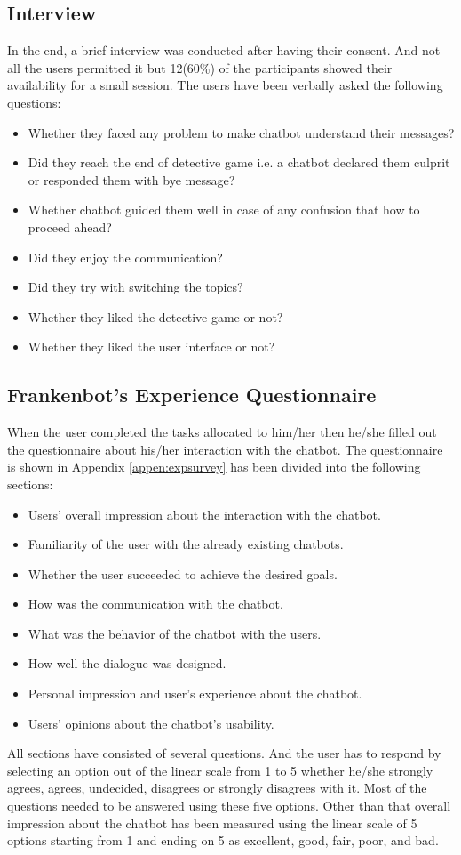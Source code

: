 \subsection{Interview\label{subsec:interview}}
In the end, a brief interview was conducted after having their consent. And not all the users permitted it but 12(60\%) of the participants showed their availability for a small session. The users have been verbally asked the following questions:
\begin{itemize}
    \item Whether they faced any problem to make chatbot understand their messages?
    \item Did they reach the end of detective game i.e. a chatbot declared them culprit or responded them with bye message?
    \item Whether chatbot guided them well in case of any confusion that how to proceed ahead?
    \item Did they enjoy the communication?
    \item Did they try with switching the topics?
    \item Whether they liked the detective game or not?
    \item Whether they liked the user interface or not?
\end{itemize}

\subsection{Frankenbot's Experience Questionnaire}
When the user completed the tasks allocated to him/her then he/she filled out the questionnaire about his/her interaction with the chatbot. The questionnaire is shown in Appendix \ref{appen:expsurvey} has been divided into the following sections:
\begin{itemize}
    \item Users' overall impression about the interaction with the chatbot.
    \item Familiarity of the user with the already existing chatbots.
    \item Whether the user succeeded to achieve the desired goals.
    \item How was the communication with the chatbot.
    \item What was the behavior of the chatbot with the users.
    \item How well the dialogue was designed.
    \item Personal impression and user's experience about the chatbot.
    \item Users' opinions about the chatbot's usability. 
\end{itemize} 
All sections have consisted of several questions. And the user has to respond by selecting an option out of the linear scale from 1 to 5 whether he/she strongly agrees, agrees, undecided, disagrees or strongly disagrees with it. Most of the questions needed to be answered using these five options. Other than that overall impression about the chatbot has been measured using the linear scale of 5 options starting from 1 and ending on 5 as excellent, good, fair, poor, and bad.

